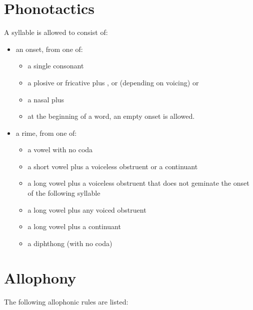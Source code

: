 \documentclass{book}
\begin{document}
\section{Phonotactics}

A syllable is allowed to consist of:

\begin{itemize}
    \item an onset, from one of:
    \begin{itemize}
        \item a single consonant
        \item a plosive or fricative plus ,  or (depending on voicing)  or 
        \item a nasal plus 
        \item at the beginning of a word, an empty onset is allowed.
    \end{itemize}
    \item a rime, from one of:
    \begin{itemize}
        \item a vowel with no coda
        \item a short vowel plus a voiceless obstruent or a continuant
        \item a long vowel plus a voiceless obstruent that does not geminate the onset of the following syllable
        \item a long vowel plus any voiced obstruent
        \item a long vowel plus a continuant
        \item a diphthong (with no coda)
    \end{itemize}
\end{itemize}

\section{Allophony}

The following allophonic rules are listed:
\end{document}
